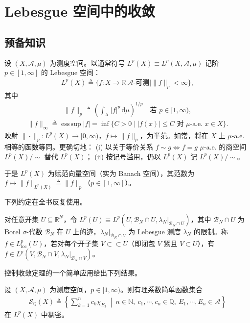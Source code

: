 \documentclass[../../main.tex]{subfiles}%
\begin{document}
\section{Lebesgue 空间中的收敛}\label{section:ch02-Lebesgue收敛}

\subsection{预备知识}\label{subsection:ch02-Lp预备}

设 $(X,\mathscr A,\mu)$ 为测度空间。以通常符号 $L^p(X)\equiv L^p(X,\mathscr A,\mu)$ 记阶 $p\in[1,\infty]$ 的 Lebesgue 空间：
\begin{align*}
L^p(X)\triangleq \{f:X\to\mathbb R\ \mathscr A\text{-可测}\mid\|f\|_p<\infty\},
\end{align*}
其中
\begin{align*}
\|f\|_p\triangleq \left(\int_X|f|^p\,\mathrm{d}\mu\right)^{1/p}\quad\text{若 }p\in[1,\infty),
\end{align*}
\begin{align*}
\|f\|_\infty\triangleq \operatorname*{ess\,sup}|f|
=\inf\{C>0\mid|f(x)|\leqslant C\text{ 对 }\mu\text{-a.e. }x\in X\}.
\end{align*}
映射 $\|\cdot\|_p:L^p(X)\to[0,\infty)$，$f\mapsto\|f\|_p$，为半范。如常，将在 $X$ 上 $\mu$-a.e. 相等的函数等同。更确切地：
(i) 以关于等价关系 $f\sim g\Leftrightarrow f=g$ $\mu$-a.e. 的商空间 $L^p(X)/\sim$ 替代 $L^p(X)$；
(ii) 按记号滥用，仍以 $L^p(X)$ 记 $L^p(X)/\sim$。

于是 $L^p(X)$ 为赋范向量空间（实为 Banach 空间），其范数为 $f\mapsto\|f\|_{L^p(X)}\triangleq \|f\|_p$（$p\in[1,\infty]$）。

下列约定在全书反复使用。

\begin{remark}\label{remark:ch02-Lploc}
\label{remark:ch02-Lp局部}
对任意开集 $U\subseteq\mathbb R^N$，令 $L^p(U)\equiv L^p(U,\mathscr B_N\cap U,\lambda_N|_{\mathscr B_N\cap U})$，其中 $\mathscr B_N\cap U$ 为 Borel $\sigma$-代数 $\mathscr B_N$ 在 $U$ 上的迹，$\lambda_N|_{\mathscr B_N\cap U}$ 为 Lebesgue 测度 $\lambda_N$ 的限制。称 $f\in L^p_{\mathrm{loc}}(U)$，若对每个开子集 $V\subset\subset U$（即闭包 $\bar V$ 紧且 $V\subset U$），有 $f\in L^p(V,\mathscr B_N\cap V,\lambda_N|_{\mathscr B_N\cap V})$。
\end{remark}

控制收敛定理的一个简单应用给出下列结果。

\begin{lemma}\label{lemma:ch02-有理简单函数稠密}
\label{lemma:ch02-简单函数}
设 $(X,\mathscr A,\mu)$ 为测度空间，$p\in[1,\infty)$。则有理系数简单函数集合
\begin{align*}
\mathscr S_{\mathbb Q}(X)\triangleq \left\{\sum_{k=1}^n c_k\chi_{E_k}\ \middle|\ n\in\mathbb N,\ c_1,\cdots ,c_n\in\mathbb Q,\ E_1,\cdots ,E_n\in\mathscr A\right\}
\end{align*}
在 $L^p(X)$ 中稠密。
\end{lemma}
\end{document}
